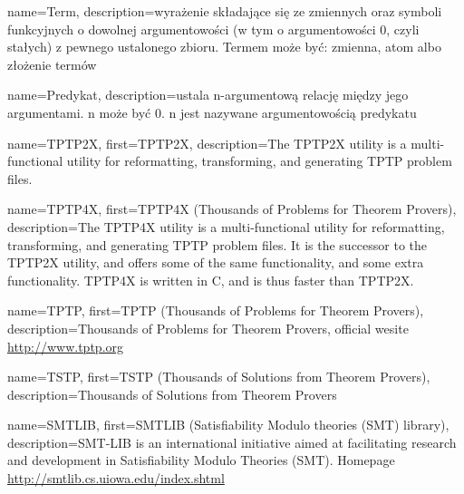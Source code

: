  {
    name=Term,
    description={wyrażenie składające się ze zmiennych oraz symboli funkcyjnych o dowolnej argumentowości (w tym o argumentowości 0, czyli stałych) z pewnego ustalonego zbioru. Termem może być: zmienna, atom albo złożenie termów}
}

 {
    name=Predykat,
    description={ustala n-argumentową relację między jego argumentami. n może być 0. n jest nazywane argumentowością predykatu}
}

 {
    name=TPTP2X,
    first={TPTP2X},
    description={The TPTP2X utility is a multi-functional utility for reformatting, transforming, and generating TPTP problem files.}
}

 {
    name=TPTP4X,
    first={TPTP4X (Thousands of Problems for Theorem Provers)},
    description={The TPTP4X utility is a multi-functional utility for reformatting, transforming, and generating TPTP problem files. It is the successor to the TPTP2X utility, and offers some of the same functionality, and some extra functionality. TPTP4X is written in C, and is thus faster than TPTP2X.}
}

 {
    name=TPTP,
    first={TPTP (Thousands of Problems for Theorem Provers)},
    description={Thousands of Problems for Theorem Provers, official wesite \url{http://www.tptp.org}}
}

 {
    name=TSTP,
    first={TSTP (Thousands of Solutions from Theorem Provers)},
    description={Thousands of Solutions from Theorem Provers}
}

 {
    name=SMTLIB,
    first={SMTLIB (Satisfiability Modulo theories (SMT) library)},
  description={SMT-LIB is an international initiative aimed at facilitating research and development in Satisfiability Modulo Theories (SMT). Homepage \url{http://smtlib.cs.uiowa.edu/index.shtml}}
}


%
%


